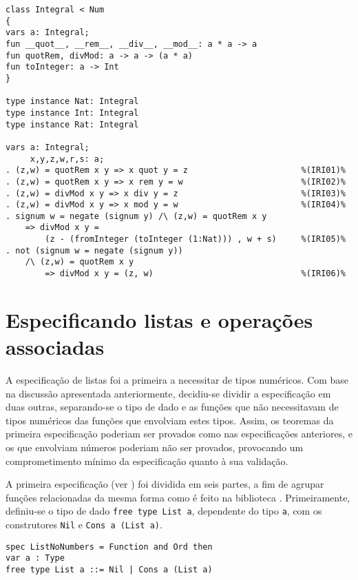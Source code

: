 \begin{Verbatim}                                                 
class Integral < Num
{
vars a: Integral;
fun __quot__, __rem__, __div__, __mod__: a * a -> a
fun quotRem, divMod: a -> a -> (a * a)
fun toInteger: a -> Int
}

type instance Nat: Integral
type instance Int: Integral
type instance Rat: Integral

vars a: Integral;
     x,y,z,w,r,s: a;
. (z,w) = quotRem x y => x quot y = z                       %(IRI01)%
. (z,w) = quotRem x y => x rem y = w                        %(IRI02)%
. (z,w) = divMod x y => x div y = z                         %(IRI03)%
. (z,w) = divMod x y => x mod y = w                         %(IRI04)%
. signum w = negate (signum y) /\ (z,w) = quotRem x y   
    => divMod x y =                                     
        (z - (fromInteger (toInteger (1:Nat))) , w + s)     %(IRI05)%
. not (signum w = negate (signum y))                    
    /\ (z,w) = quotRem x y                              
        => divMod x y = (z, w)                              %(IRI06)%
\end{Verbatim}

\section{Especificando listas e operações associadas}
A especificação de listas foi a primeira a necessitar de tipos numéricos.
Com base na discussão apresentada anteriormente, decidiu-se dividir a especificação em duas outras, separando-se o tipo de dado e as funções que não necessitavam de tipos numéricos das funções que envolviam estes tipos.
Assim, os teoremas da primeira especificação poderiam ser provados como nas especificações anteriores, e os que envolviam números poderiam não ser provados, provocando um comprometimento mínimo da especificação quanto à sua validação.

A primeira especificação (ver ) foi dividida em seis partes, a fim de agrupar funções relacionadas da mesma forma como é feito na biblioteca \Prelude.
Primeiramente, definiu-se o tipo de dado \Verb.free type List a., dependente do tipo \Verb.a., com os construtores \Verb.Nil. e \Verb.Cons a (List a)..

\begin{Verbatim}
spec ListNoNumbers = Function and Ord then 
var a : Type 
free type List a ::= Nil | Cons a (List a) 
\end{Verbatim}

